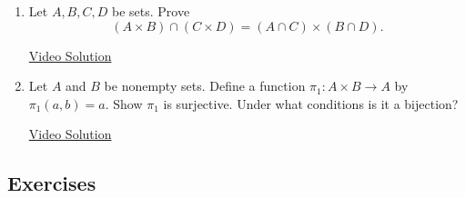 \begin{enumerate}\renewcommand{\labelenumi}{\thesubsection.\theenumi}
\item Let $A,B,C,D$ be sets. Prove
\[
(A \times B) \cap (C \times D) = (A \cap C) \times (B \cap D).
\]

\href{https://youtu.be/TpjjI0dCfok}{Video Solution}

\item Let $A$ and $B$ be nonempty sets. Define a function $\pi_1 : A \times B \to A$ by $\pi_1(a,b) = a$. Show $\pi_1$ is surjective. Under what conditions is it a bijection?

\href{https://youtu.be/qIhugCqylC0}{Video Solution}
\end{enumerate}

\subsection*{Exercises}

